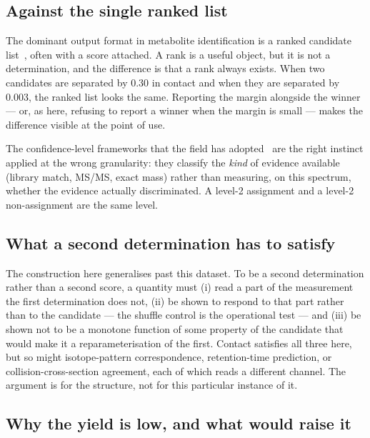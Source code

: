 \documentclass[11pt,twocolumn,a4paper]{article}
\theoremstyle{definition}
\theoremstyle{remark}
\begin{document}
\subsection{Against the single ranked list}

The dominant output format in metabolite identification is a ranked candidate
list~\citep{duhrkop2019sirius,ruttkies2016metfrag,blazenovic2018software}, often
with a score attached. A rank is a useful object, but it is not a determination,
and the difference is that a rank always exists. When two candidates are
separated by 0.30 in contact and when they are separated by 0.003, the ranked
list looks the same. Reporting the margin alongside the winner --- or, as here,
refusing to report a winner when the margin is small --- makes the difference
visible at the point of use.

The confidence-level frameworks that the field has
adopted~\citep{schymanski2014identifying,sumner2007proposed} are the right instinct
applied at the wrong granularity: they classify the \emph{kind} of evidence
available (library match, MS/MS, exact mass) rather than measuring, on this
spectrum, whether the evidence actually discriminated. A level-2 assignment and a
level-2 non-assignment are the same level.

\subsection{What a second determination has to satisfy}

The construction here generalises past this dataset. To be a second determination
rather than a second score, a quantity must (i) read a part of the measurement the
first determination does not, (ii) be shown to respond to that part rather than to
the candidate --- the shuffle control is the operational test --- and (iii) be
shown not to be a monotone function of some property of the candidate that would
make it a reparameterisation of the first. Contact satisfies all three here, but
so might isotope-pattern correspondence, retention-time prediction, or
collision-cross-section agreement, each of which reads a different channel. The
argument is for the structure, not for this particular instance of it.

\subsection{Why the yield is low, and what would raise it}
\end{document}
